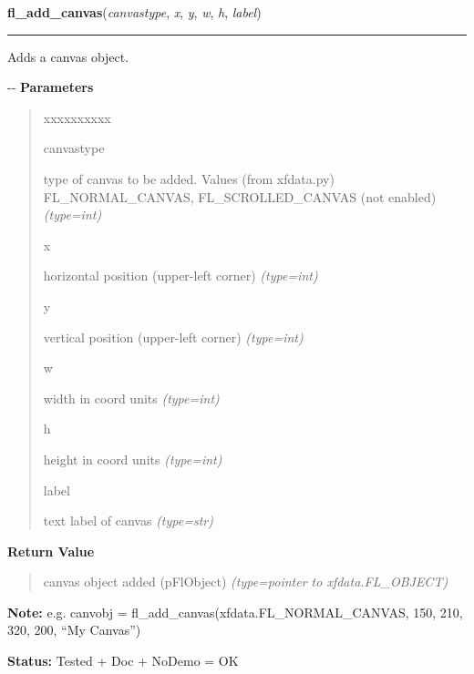 \hspace{.8\funcindent}\begin{boxedminipage}{\funcwidth}

    \raggedright \textbf{fl\_add\_canvas}(\textit{canvastype}, \textit{x}, \textit{y}, \textit{w}, \textit{h}, \textit{label})

    \vspace{-1.5ex}

    \rule{\textwidth}{0.5\fboxrule}
\setlength{\parskip}{2ex}

Adds a canvas object.

-{}-
\setlength{\parskip}{1ex}
      \textbf{Parameters}
      \vspace{-1ex}

      \begin{quote}
        \begin{Ventry}{xxxxxxxxxx}

          \item[canvastype]


type of canvas to be added. Values (from xfdata.py) FL\_NORMAL\_CANVAS,
FL\_SCROLLED\_CANVAS (not enabled)
            {\it (type=int)}

          \item[x]


horizontal position (upper-left corner)
            {\it (type=int)}

          \item[y]


vertical position (upper-left corner)
            {\it (type=int)}

          \item[w]


width in coord units
            {\it (type=int)}

          \item[h]


height in coord units
            {\it (type=int)}

          \item[label]


text label of canvas
            {\it (type=str)}

        \end{Ventry}

      \end{quote}

      \textbf{Return Value}
    \vspace{-1ex}

      \begin{quote}

canvas object added (pFlObject)
      {\it (type=pointer to xfdata.FL\_OBJECT)}

      \end{quote}

\textbf{Note:} 
e.g. canvobj = fl\_add\_canvas(xfdata.FL\_NORMAL\_CANVAS, 150, 210,
320, 200, ``My Canvas'')


\textbf{Status:} 
Tested + Doc + NoDemo = OK


    \end{boxedminipage}

